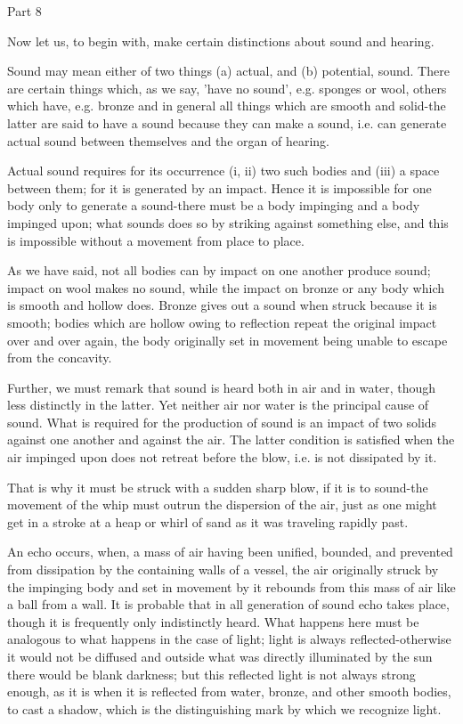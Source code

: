 Part 8

Now let us, to begin with, make certain distinctions about sound and
hearing. 

Sound may mean either of two things (a) actual, and (b) potential,
sound. There are certain things which, as we say, 'have no sound',
e.g. sponges or wool, others which have, e.g. bronze and in general
all things which are smooth and solid-the latter are said to have
a sound because they can make a sound, i.e. can generate actual sound
between themselves and the organ of hearing. 

Actual sound requires for its occurrence (i, ii) two such bodies and
(iii) a space between them; for it is generated by an impact. Hence
it is impossible for one body only to generate a sound-there must
be a body impinging and a body impinged upon; what sounds does so
by striking against something else, and this is impossible without
a movement from place to place. 

As we have said, not all bodies can by impact on one another produce
sound; impact on wool makes no sound, while the impact on bronze or
any body which is smooth and hollow does. Bronze gives out a sound
when struck because it is smooth; bodies which are hollow owing to
reflection repeat the original impact over and over again, the body
originally set in movement being unable to escape from the concavity.

Further, we must remark that sound is heard both in air and in water,
though less distinctly in the latter. Yet neither air nor water is
the principal cause of sound. What is required for the production
of sound is an impact of two solids against one another and against
the air. The latter condition is satisfied when the air impinged upon
does not retreat before the blow, i.e. is not dissipated by it.

That is why it must be struck with a sudden sharp blow, if it is to
sound-the movement of the whip must outrun the dispersion of the air,
just as one might get in a stroke at a heap or whirl of sand as it
was traveling rapidly past. 

An echo occurs, when, a mass of air having been unified, bounded,
and prevented from dissipation by the containing walls of a vessel,
the air originally struck by the impinging body and set in movement
by it rebounds from this mass of air like a ball from a wall. It is
probable that in all generation of sound echo takes place, though
it is frequently only indistinctly heard. What happens here must be
analogous to what happens in the case of light; light is always reflected-otherwise
it would not be diffused and outside what was directly illuminated
by the sun there would be blank darkness; but this reflected light
is not always strong enough, as it is when it is reflected from water,
bronze, and other smooth bodies, to cast a shadow, which is the distinguishing
mark by which we recognize light. 

